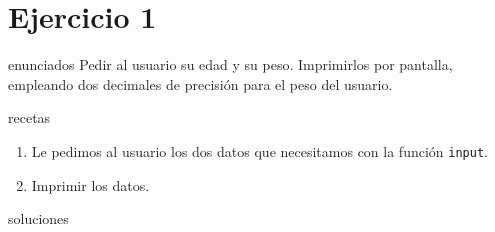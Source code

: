 \section{Ejercicio 1}
\def\parte{enunciados}
\ifx\capitulo\parte
Pedir al usuario su edad y su peso. Imprimirlos por pantalla, empleando dos decimales de precisión para el peso del usuario.
\fi

\def\parte{recetas}
\ifx\capitulo\parte
\begin{enumerate}
\item Le pedimos al usuario los dos datos que necesitamos con la función \lstinline|input|.
\item Imprimir los datos.
\end{enumerate}
\fi

\def\parte{soluciones}
\ifx\capitulo\parte

\fi
